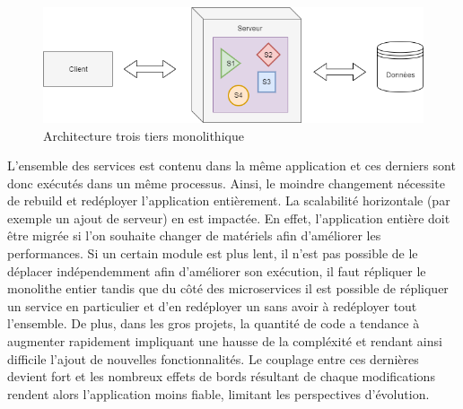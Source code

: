 \begin{figure}[H]
	\includegraphics[scale=0.5]{images/travailNeuflizeOBC/architecture/troisTiers.png}
	\centering
	\caption{Architecture trois tiers monolithique}
	\label{troisTiers}
\end{figure}
	
	L'ensemble des services est contenu dans la même application et ces derniers sont donc exécutés dans un même processus. Ainsi, le moindre changement nécessite de rebuild et redéployer l'application entièrement. La scalabilité horizontale (par exemple un ajout de serveur) en est impactée. En effet, l'application entière doit être migrée si l'on souhaite changer de matériels afin d'améliorer les performances. Si un certain module est plus lent, il n'est pas possible de le déplacer indépendemment afin d'améliorer son exécution, il faut répliquer le monolithe entier tandis que du côté des microservices il est possible de répliquer un service en particulier et d'en redéployer un sans avoir à redéployer tout l'ensemble. De plus, dans les gros projets, la quantité de code a tendance à augmenter rapidement impliquant une hausse de la compléxité et rendant ainsi difficile l'ajout de nouvelles fonctionnalités. Le couplage entre ces dernières devient fort et les nombreux effets de bords résultant de chaque modifications rendent alors l'application moins fiable, limitant les perspectives d'évolution. 

